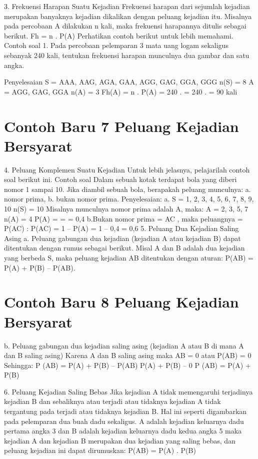 \documentclass[11pt,fleqn]{book} %
\begin{document}
{{3. Frekuensi Harapan Suatu Kejadian
Frekuensi harapan dari sejumlah kejadian merupakan banyaknya kejadian dikalikan
dengan peluang kejadian itu. Misalnya pada percobaan A dilakukan n kali, maka frekuensi
harapannya ditulis sebagai berikut.
Fh = n . P(A)
Perhatikan contoh berikut untuk lebih memahami.
Contoh soal
1. Pada percobaan pelemparan 3 mata uang logam sekaligus sebanyak 240 kali,
tentukan frekuensi harapan munculnya dua gambar dan satu angka.



Penyelesaian
S = {AAA, AAG, AGA, GAA, AGG, GAG, GGA, GGG}  n(S) = 8
A = {AGG, GAG, GGA} n(A) = 3
Fh(A) = n . P(A) = 240 . 
= 240 .  = 90 kali

\section{Contoh Baru 7 Peluang Kejadian Bersyarat}

4. Peluang Komplemen Suatu Kejadian
Untuk lebih jelasnya, pelajarilah contoh soal berikut ini.
Contoh soal
Dalam sebuah kotak terdapat bola yang diberi nomor 1 sampai 10. 
Jika diambil sebuah bola, berapakah peluang munculnya:
a. nomor prima,
b. bukan nomor prima.
Penyelesaian:
a. S = {1, 2, 3, 4, 5, 6, 7, 8, 9, 10}  n(S) = 10
Misalnya munculnya nomor prima adalah A, maka:
A = {2, 3, 5, 7}  n(A) = 4
P(A) =  =  = 0,4
b.Bukan nomor prima = AC , 
 	maka peluangnya = P(AC) : P(AC) = 1 – P(A) = 1 – 0,4 = 0,6
5. Peluang Dua Kejadian Saling Asing
a. Peluang gabungan dua kejadian (kejadian A atau kejadian B) dapat ditentukan dengan rumus sebagai berikut.
Misal A dan B adalah dua kejadian yang berbeda S, maka peluang kejadian AB ditentukan dengan aturan:
P(AB) = P(A) + P(B) – P(AB).


\section{Contoh Baru 8 Peluang Kejadian Bersyarat}

b. Peluang gabungan dua kejadian saling asing (kejadian A atau B di mana A dan B saling asing)
Karena A dan B saling asing maka AB = 0 atau P(AB) = 0
Sehingga: P (AB) = P(A) + P(B) – P(AB)
P(A) + P(B) – 0
P (AB) = P(A) + P(B)

6. Peluang Kejadian Saling Bebas
Jika kejadian A tidak memengaruhi terjadinya kejadian B dan sebaliknya atau terjadi
atau tidaknya kejadian A tidak tergantung pada terjadi atau tidaknya kejadian B. Hal ini
seperti digambarkan pada pelemparan dua buah dadu sekaligus.
A adalah kejadian keluarnya dadu pertama angka 3 dan B adalah kejadian keluarnya
dadu kedua angka 5 maka kejadian A dan kejadian B merupakan dua kejadian yang
saling bebas, dan peluang kejadian ini dapat dirumuskan:
P(AB) = P(A) . P(B)

}}
\end{document}
